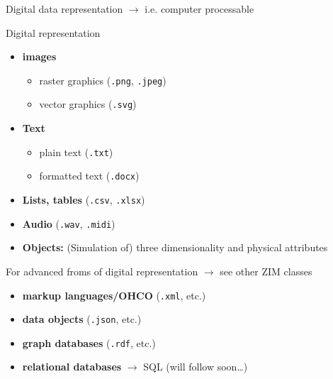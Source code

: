 \begin{frame}[allowframebreaks]{Digital data representation}
$\to$ i.e. \alert{computer processable}
\begin{block}{Digital representation}
    \begin{itemize}
        \item \textbf{images} 
        \begin{itemize}
            \item raster graphics (\texttt{.png}, \texttt{.jpeg}) 
            \item vector graphics (\texttt{.svg})
        \end{itemize}
        \item \textbf{Text}
        \begin{itemize}
            \item plain text (\texttt{.txt})
            \item formatted text (\texttt{.docx})
        \end{itemize}
        \item \textbf{Lists, tables} (\texttt{.csv}, \texttt{.xlsx})
        \item \textbf{Audio} (\texttt{.wav}, \texttt{.midi})
        \item \textbf{Objects:} (Simulation of) three dimensionality and physical attributes
    \end{itemize}
\end{block}
\framebreak 

\begin{block}{For advanced froms of digital representation $\to$ see other ZIM classes}
\begin{itemize}
    \item \textbf{markup languages/OHCO} (\texttt{.xml}, etc.)
    \item \textbf{data objects} (\texttt{.json}, etc.) 
    \item \textbf{graph databases} (\texttt{.rdf}, etc.)
    \item \textbf{relational databases} $\to$ SQL (will follow soon\dots)
\end{itemize}
\end{block}
\end{frame}

